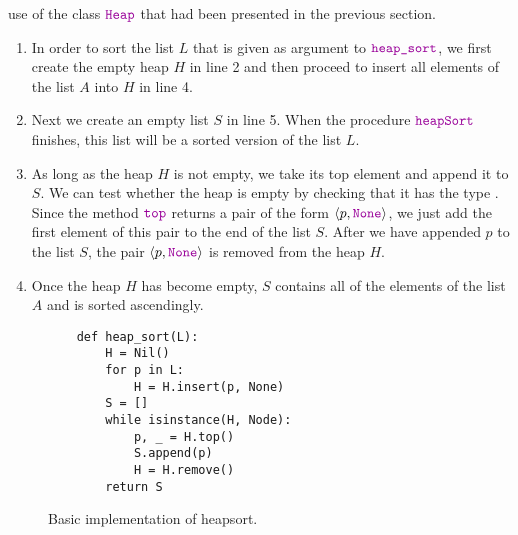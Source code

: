 use of the class $\mytt{Heap}$ that had been presented in the previous section.
\begin{enumerate}
\item In order to sort the list $L$ that is given as argument to $\mytt{heap\_sort}$, we first
      create the empty heap $H$ in line 2 and then proceed to insert all elements of the list
      $A$ into $H$ in line 4.  
\item Next we create an empty list $S$ in line 5. When the procedure $\mytt{heapSort}$
      finishes, this list will be a sorted version of the list $L$.
\item As long as the heap $H$ is not empty, we take its top element and append it to
      $S$.  We can test whether the heap is empty by checking that it has the type .
      Since the method $\mytt{top}$ returns a pair of the form $\langle p, \mytt{None}\rangle$,
      we just add the first element of this pair to the
      end of the list $S$.  After we have appended $p$ to the list $S$, the pair
      $\langle p, \mytt{None}\rangle$ is removed from the heap ${H}$.
\item Once the heap ${H}$ has become empty, ${S}$ contains all of the elements of the list ${A}$
      and is sorted ascendingly.
\end{enumerate}

\begin{figure}[!ht]
\centering
\begin{verbatim}
    def heap_sort(L):
        H = Nil()
        for p in L:
            H = H.insert(p, None)
        S = []
        while isinstance(H, Node):
            p, _ = H.top()
            S.append(p)
            H = H.remove()
        return S
\end{verbatim}
\vspace*{-0.3cm}
\caption{Basic implementation of heapsort.}
\label{fig:Heap.ipynb:heap_sort}
\end{figure}


